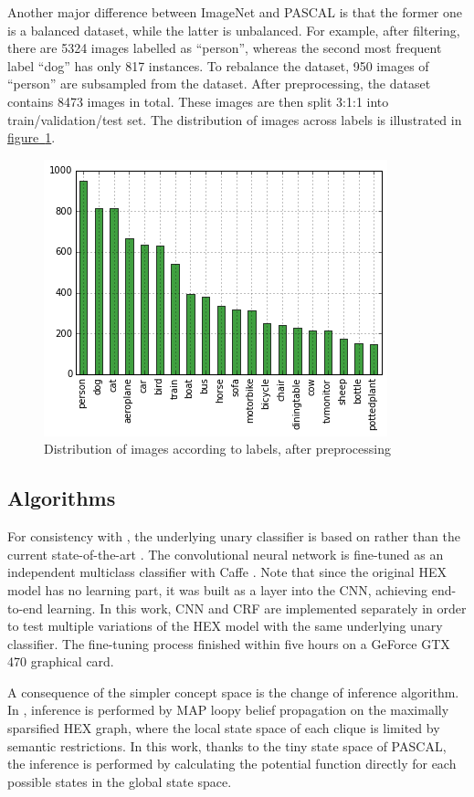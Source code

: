 \documentclass[11pt,a4paper]{article}
\begin{document}
Another major difference between ImageNet and PASCAL is that the former one is a balanced dataset, while the latter is unbalanced. For example, after filtering, there are 5324 images labelled as ``person'', whereas the second most frequent label ``dog'' has only 817 instances. To rebalance the dataset, 950 images of ``person'' are subsampled from the dataset.  After preprocessing, the dataset contains 8473 images in total. These images are then split 3:1:1 into train/validation/test set. The distribution of images across labels is illustrated in \hyperref[fig:distro]{figure~\ref{fig:distro}}.
\begin{figure}[htbp]
\centering
\includegraphics[scale=1]{distro.png}
\caption{Distribution of images according to labels, after preprocessing}
\label{fig:distro}
\end{figure}

\subsection{Algorithms}

For consistency with \cite{deng2014large}, the underlying unary classifier is based on \cite{krizhevsky2012imagenet} rather than the current state-of-the-art \cite{simonyan2014very}. The convolutional neural network is fine-tuned as an independent multiclass classifier with Caffe \cite{jia2014caffe}. Note that since the original HEX model has no learning part, it was built as a layer into the CNN, achieving end-to-end learning. In this work, CNN and CRF are implemented separately in order to test multiple variations of the HEX model with the same underlying unary classifier. The fine-tuning process finished within five hours on a GeForce GTX 470 graphical card.

A consequence of the simpler concept space is the change of inference algorithm. In \cite{deng2014large}, inference is performed by MAP loopy belief propagation on the maximally sparsified HEX graph, where the local state space of each clique is limited by semantic restrictions. In this work, thanks to the tiny state space of PASCAL, the inference is performed by calculating the potential function directly for each possible states in the global state space.
\end{document}
